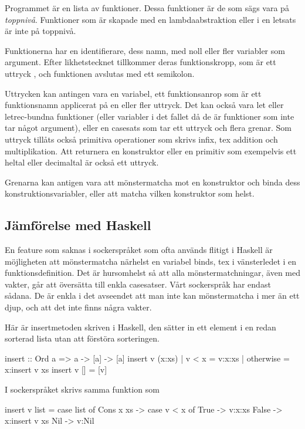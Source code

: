 \documentclass[Rapport]{subfiles}
\begin{document}
Programmet är en lista av funktioner. Dessa funktioner är de som sägs vara på
\emph{toppnivå}. Funktioner som är skapade med en lambdaabstraktion eller i en
letsats är inte på toppnivå. 

  Funktionerna har en identifierare, dess namn, med noll eller fler variabler som argument. Efter likhetstecknet
tillkommer deras funktionskropp, som är ett uttryck , och funktionen avslutas med
ett semikolon.

    Uttrycken kan antingen vara en variabel, ett funktionsanrop som är ett
funktionsnamn applicerat på en eller fler uttryck. Det kan också vara let eller
letrec-bundna funktioner (eller variabler i det fallet då de är funktioner som
inte tar något argument), eller en casesats som tar ett uttryck och flera grenar.
Som uttryck tillåts också primitiva operationer som skrivs infix, tex addition 
och multiplikation. Att returnera en konstruktor eller en primitiv som 
exempelvis ett heltal eller decimaltal är också ett uttryck.

    Grenarna kan antigen vara att mönstermatcha mot en konstruktor och binda
dess konstruktionsvariabler, eller att matcha vilken konstruktor som helst.


\subsection{Jämförelse med Haskell}

    En feature som saknas i sockerspråket som ofta används flitigt i Haskell är 
möjligheten att mönstermatcha närhelst en variabel binds, tex i vänsterledet
i en funktionsdefinition. Det är hursomhelst så att alla mönstermatchningar,
även med vakter, går att översätta till enkla casesatser. Vårt sockerspråk
har endast sådana. De är enkla i det avseendet att man inte kan mönstermatcha i 
mer än ett djup, och att det inte finns några vakter.

Här är insertmetoden skriven i Haskell, den sätter in ett element i en redan sorterad
lista utan att förstöra sorteringen.

\begin{codeEx}
  insert :: Ord a => a -> [a] -> [a]
  insert v (x:xs) 
      | v < x     = v:x:xs
      | otherwise = x:insert v xs 
  insert v [] = [v]
\end{codeEx}                  

I sockerspråket skrivs samma funktion som

\begin{codeEx}
  insert v list = case list of
      Cons x xs -> case v < x of
          True  -> v:x:xs
          False -> x:insert v xs
      Nil -> v:Nil
\end{codeEx}
\end{document}
